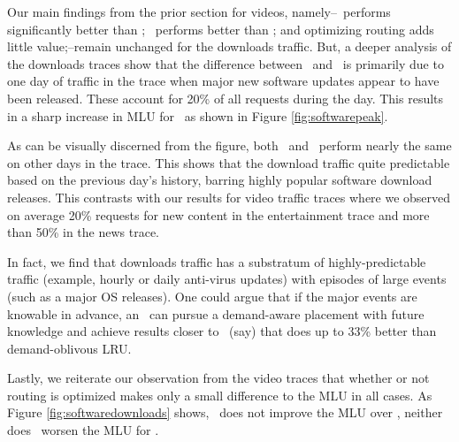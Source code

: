 {Our main findings from the prior section for videos, namely--\invlru\ performs significantly better than \optrp; \optrpfuture\ performs better than  \invlru; and optimizing routing adds little value;--remain unchanged for the downloads traffic.
But, a deeper analysis of the downloads traces show that the difference between \invcap\ and \optrp\ is primarily due to one day of traffic in the trace when major new software updates appear to have been released. These account for 20\% of all requests during the day. This results in a sharp increase in MLU for \optrp\ as shown in Figure \ref{fig:softwarepeak}. 

As can be visually discerned from the figure, both  \optrp\  and  \optrpfuture\ perform nearly the same on other days in the trace.  This shows that the download traffic quite predictable based on the previous day's history, barring highly popular software download releases.  This contrasts with our results for video traffic traces where we observed on average  20\% requests for new content in  the entertainment trace and more than 50\% in the news trace. 

In fact, we find that downloads traffic has a substratum of highly-predictable traffic (example, hourly or daily anti-virus updates) with episodes of large events (such as a major OS releases). One could argue that if the major events are knowable in advance, an \ncp\ can pursue a demand-aware placement with future knowledge and achieve results closer to \invoptpfuture\ (say) that does up to 33\% better than demand-oblivous LRU. 

Lastly, we reiterate our observation from the video traces that whether or not routing is optimized makes only a small difference to the MLU in all cases. As Figure \ref{fig:softwaredownloads} shows, \optlru\ does not improve the MLU over   \invlru, neither does  \invoptpfuture\ worsen the MLU for   \optrpfuture. 
}





